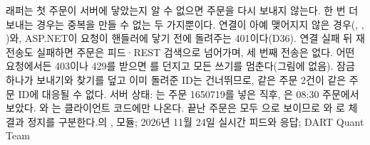 {\begin{tikzpicture}
\end{tikzpicture}}{래퍼는 첫 주문이 서버에 닿았는지 알 수 없으면 주문을 다시 보내지 않는다. 한 번 더 보내는 경우는 중복을 만들 수 없는 두 가지뿐이다. 연결이 아예 맺어지지 않은 경우(, , )와, ASP.NET이 요청이 핸들러에 닿기 전에 돌려주는 401이다(D36). 연결 실패 뒤 재전송도 실패하면 주문은 피드·REST 검색으로 넘어가며, 세 번째 전송은 없다. 어떤 요청에서든 403이나 429를 받으면 를 던지고 모든 쓰기를 멈춘다(그림에 없음). 잠금 하나가 보내기와 찾기를 덮고 이미 돌려준 ID는 건너뛰므로, 같은 주문 2건이 같은 주문 ID에 대응될 수 없다. 서버 상태: 는 주문 1650719를 넣은 직후, 은 08:30 주문에서 보았다. 와 는 클라이언트 코드에만 나온다. 끝난 주문은 모두 으로 보이므로 와 로 체결과 정지를 구분한다.}{의 ,  모듈; 2026년 11월 24일 실시간 피드와  응답; DART Quant Team}
